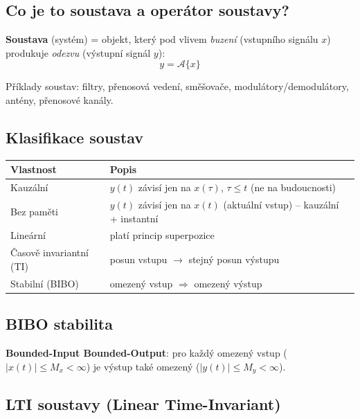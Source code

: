 \documentclass[12pt,a4paper]{article}
\begin{document}
\begin{hvezdBox}
\subsection*{Co je to soustava a operátor soustavy?}
\end{hvezdBox}

\textbf{Soustava} (systém) = objekt, který pod vlivem \emph{buzení} (vstupního signálu $x$) produkuje \emph{odezvu} (výstupní signál $y$):
\[
  y = \mathcal{A}\{x\}
\]

Příklady soustav: filtry, přenosová vedení, směšovače, modulátory/demodulátory, antény, přenosové kanály.

\subsection*{Klasifikace soustav}

\begin{center}
\begin{tabular}{ll}
\toprule
\textbf{Vlastnost} & \textbf{Popis} \\
\midrule
Kauzální & $y(t)$ závisí jen na $x(\tau)$, $\tau \leq t$ (ne na budoucnosti) \\
Bez paměti & $y(t)$ závisí jen na $x(t)$ (aktuální vstup) – kauzální + instantní \\
Lineární & platí princip superpozice \\
Časově invariantní (TI) & posun vstupu $\to$ stejný posun výstupu \\
Stabilní (BIBO) & omezený vstup $\Rightarrow$ omezený výstup \\
\bottomrule
\end{tabular}
\end{center}

\subsection*{BIBO stabilita}

\textbf{Bounded-Input Bounded-Output}: pro každý omezený vstup ($|x(t)| \leq M_x < \infty$) je výstup také omezený ($|y(t)| \leq M_y < \infty$).

\begin{hvezdBox}
\subsection*{LTI soustavy (Linear Time-Invariant)}
\end{hvezdBox}
\end{document}
